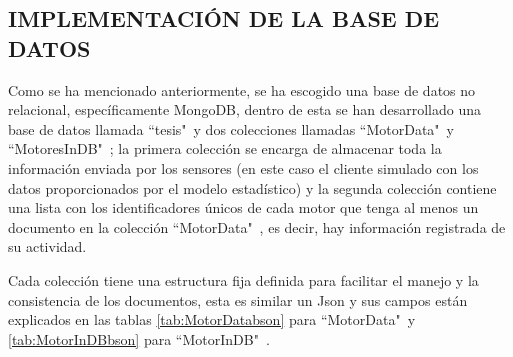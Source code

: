 

\subsection{IMPLEMENTACIÓN DE LA BASE DE DATOS}

    Como se ha mencionado anteriormente, se ha escogido una base de datos no
    relacional, específicamente MongoDB, dentro de esta se han desarrollado
    una base de datos llamada ``tesis"\   y dos colecciones llamadas ``MotorData"\  y
    ``MotoresInDB"\ ; la primera colección se encarga de almacenar toda la información
    enviada por los sensores (en este caso el cliente simulado con los datos
    proporcionados por el modelo estadístico) y la segunda colección contiene una
    lista con los identificadores únicos de cada motor que tenga al menos un documento
    en la colección ``MotorData"\ , es decir, hay información registrada de su actividad.

    Cada colección tiene una estructura fija definida para facilitar el manejo y
    la consistencia de los documentos, esta es similar un Json y sus campos
    están explicados en las tablas \ref{tab:MotorDatabson} para ``MotorData"\  y
    \ref{tab:MotorInDBbson} para ``MotorInDB"\ .

